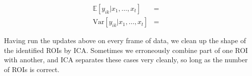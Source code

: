 \documentclass[11pt]{amsart}
\begin{document}
\begin{eqnarray}
\mathbb{E}[y_{ik}|x_1,\ldots,x_t] & = & \label{eqn:roi_posterior_mean} \\
\mathrm{Var}[y_{ik}|x_1,\ldots,x_t] & = & \label{eqn:roi_posterior_var}
\end{eqnarray}

Having run the updates above on every frame of data, we clean up the shape of the identified ROIs by ICA. Sometimes we erroneously combine part of one ROI with another, and ICA separates these cases very cleanly, so long as the number of ROIs is correct.
\end{document}
